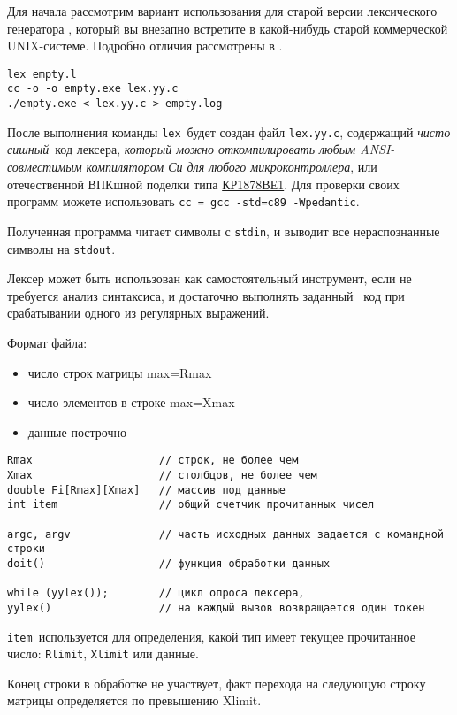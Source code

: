 Для начала рассмотрим вариант использования для старой версии
лексического генератора , который вы внезапно встретите
в какой-нибудь старой коммерческой UNIX-системе. Подробно отличия 
рассмотрены в \cite{lextoflex}.


\begin{verbatim}
lex empty.l
cc -o -o empty.exe lex.yy.c
./empty.exe < lex.yy.c > empty.log 
\end{verbatim}

После выполнения команды \verb|lex|\ будет создан 
файл \verb|lex.yy.c|, содержащий \emph{чисто сишный}\ код лексера, 
\emph{который можно откомпилировать любым ANSI-совместимым компилятором Си
для любого микроконтроллера}, или отечественной ВПКшной поделки типа 
\href{http://www.angstrem.ru/products/micro/tesey-8/KP1878BE1.html}{КР1878ВЕ1}.
Для проверки своих программ можете использовать
\verb|cc = gcc -std=c89 -Wpedantic|.

Полученная программа читает символы с \verb|stdin|, и выводит все 
нераспознанные символы на \verb|stdout|.

\secup



\secdown

\begin{framed}
\noindent Лексер может быть использован как самостоятельный инструмент, если
не требуется анализ синтаксиса, и достаточно выполнять заданный \cpp\ код
при срабатывании одного из регулярных выражений.
\end{framed}


Формат файла: \bigskip

\begin{itemize}[nosep]
\item число строк матрицы max=Rmax
\item число элементов в строке max=Xmax
\item данные построчно
\end{itemize}


\begin{verbatim}
Rmax 					// строк, не более чем 
Xmax 					// столбцов, не более чем
double Fi[Rmax][Xmax]	// массив под данные
int item				// общий счетчик прочитанных чисел

argc, argv				// часть исходных данных задается с командной строки
doit()					// функция обработки данных

while (yylex());		// цикл опроса лексера,
yylex()					// на каждый вызов возвращается один токен
\end{verbatim}

\verb|item|\ используется для определения, какой тип имеет текущее 
прочитанное число: \verb|Rlimit|, \verb|Xlimit| или данные.

Конец строки в обработке не участвует, факт перехода на следующую строку
матрицы определяется по превышению Xlimit.

\secup
\secup
